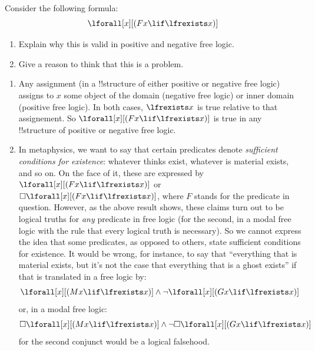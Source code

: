 \documentclass[../../../../include/open-logic-section]{subfiles}
\begin{document}
\begin{prob}
Consider the following formula:
$$\lforall[x][(Fx \lif \lfrexists x)]$$
\begin{enumerate}
	\item Explain why this is valid in positive and negative free logic.
	\item Give a reason to think that this is a problem.
\end{enumerate}
\begin{ans}
\begin{enumerate}
\item Any assignment (in a !!{structure} of either positive or negative free
	logic) assigns to $x$ some object of the domain (negative free logic) or inner
	domain (positive free logic). In both cases, $\lfrexists x$ is true relative
	to that assignement. So $\lforall[x][(Fx \lif \lfrexists x)]$ is true in any
	!!{structure} of positive or negative free logic.
\item In metaphysics, we want to say that certain predicates denote
	\emph{sufficient conditions for existence}: whatever thinks exist, whatever is
	material exists, and so on. On the face of it, these are expressed by 
	$\lforall[x][(Fx \lif \lfrexists x)]$ or $\Box\lforall[x][(Fx \lif \lfrexists x)]$,
	where $F$ stands for the predicate in question. However, as the above result shows,
	these claims turn out to be logical truths for \emph{any} predicate in free logic 
	(for the second, in a modal free logic with the rule that every logical truth is
	necessary). So we cannot express the idea that some predicates, as opposed to
	others, state sufficient conditions for existence. It would be wrong, for instance,
	to say that ``everything that is material exists, but it's not the case that everything
	that is a ghost exists'' if that is translated in a free logic by:
	$$\lforall[x][(Mx \lif \lfrexists x)] \land \lnot \lforall[x][(Gx \lif \lfrexists x)]$$ or, 
	in a modal free logic: $$\Box \lforall[x][(Mx \lif \lfrexists x)] \land \lnot \Box \lforall[x][(Gx \lif \lfrexists x)]$$ for the second conjunct would be a logical falsehood. 
\end{enumerate}
\end{ans}
\end{prob}
\end{document}
